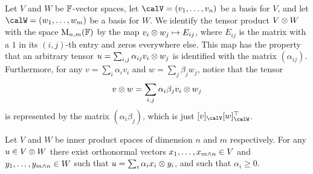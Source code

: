 Let $V$ and $W$ be $\mathbb{F}$-vector spaces, let $\calV = (v_1, \ldots, v_n)$ be a basis for $V$, and let $\calW = (w_1, \ldots, w_m)$ be a basis for $W$. We identify the tensor product $V \otimes W$ with the space $\mathrm{M}_{n,m}(\mathbb{F})$ by the map $v_i \otimes w_j \mapsto E_{ij}$, where $E_{ij}$ is the matrix with a $1$ in its $(i,j)$-th entry and zeros everywhere else. This map has the property that an arbitrary tensor $u = \sum_{i,j} \alpha_{ij} v_i \otimes w_j$ is identified with the matrix $(\alpha_{ij})$. Furthermore, for any $v = \sum_i \alpha_i v_i$ and $w = \sum_j \beta_j w_j$, notice that the tensor
%
\begin{equation*}
    v \otimes w
        = \sum_{i,j} \alpha_i \beta_j v_i \otimes w_j
\end{equation*}
%
is represented by the matrix $(\alpha_i \beta_j)$, which is just $\coordvec{v}{\calV} \trans{\coordvec{w}{\calW}}$.

\begin{theorem}
    Let $V$ and $W$ be inner product spaces of dimension $n$ and $m$ respectively. For any $u \in V \otimes W$ there exist orthonormal vectors $x_1, \ldots, x_{m \land n} \in V$ and $y_1, \ldots, y_{m \land n} \in W$ such that $u = \sum_i \alpha_i x_i \otimes y_i$, and such that $\alpha_i \geq 0$. %
\end{theorem}

